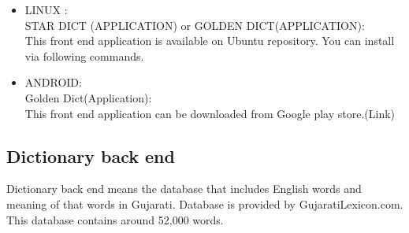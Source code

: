 \begin{itemize}
\item LINUX :\\
STAR DICT (APPLICATION)  or GOLDEN DICT(APPLICATION):\\
This front end application is available on Ubuntu repository. You can install via following commands.

\item	ANDROID:\\
Golden Dict(Application):\\
This front end application can be downloaded from Google play store.(Link)

\end{itemize}	
	\subsection{Dictionary back end}
Dictionary back end means the database that includes English words and meaning of that words in Gujarati.
	Database is provided by GujaratiLexicon.com.
	This database contains around 52,000 words.
